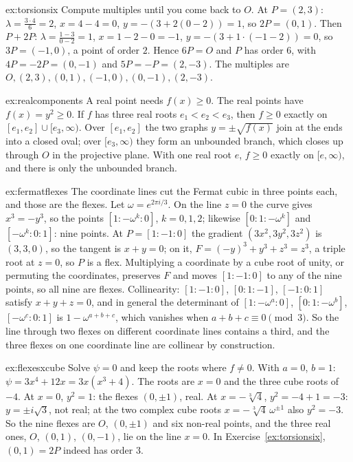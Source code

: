 \begin{solution}{ex:torsionsix}
\idea Compute multiples until you come back to $O$.
\writeup At $P=(2,3)$: $\lambda=\frac{3\cdot4}{6}=2$, $x=4-4=0$, $y=-(3+2(0-2))=1$, so $2P=(0,1)$. Then $P+2P$: $\lambda=\frac{1-3}{0-2}=1$, $x=1-2-0=-1$,
$y=-(3+1\cdot(-1-2))=0$, so $3P=(-1,0)$, a point of order $2$. Hence $6P=O$ and $P$ has order $6$, with $4P=-2P=(0,-1)$ and $5P=-P=(2,-3)$. The multiples are
$O,(2,3),(0,1),(-1,0),(0,-1),(2,-3)$.
\end{solution}

\begin{solution}{ex:realcomponents}
\idea A real point needs $f(x)\ge0$.
\writeup The real points have $f(x)=y^2\ge0$. If $f$ has three real roots $e_1<e_2<e_3$, then $f\ge0$ exactly on $[e_1,e_2]\cup[e_3,\infty)$. Over $[e_1,e_2]$ the
two graphs $y=\pm\sqrt{f(x)}$ join at the ends into a closed oval; over $[e_3,\infty)$ they form an unbounded branch, which closes up through $O$ in the
projective plane. With one real root $e$, $f\ge0$ exactly on $[e,\infty)$, and there is only the unbounded branch.
\end{solution}

\begin{solution}{ex:fermatflexes}
\idea The coordinate lines cut the Fermat cubic in three points each, and those are the flexes.
\writeup Let $\omega=e^{2\pi i/3}$. On the line $z=0$ the curve gives $x^3=-y^3$, so the points $[1:-\omega^k:0]$, $k=0,1,2$; likewise $[0:1:-\omega^k]$ and
$[-\omega^k:0:1]$: nine points. At $P=[1:-1:0]$ the gradient $(3x^2,3y^2,3z^2)$ is $(3,3,0)$, so the tangent is $x+y=0$; on it, $F=(-y)^3+y^3+z^3=z^3$, a triple root
at $z=0$, so $P$ is a flex. Multiplying a coordinate by a cube root of unity, or permuting the coordinates, preserves $F$ and moves $[1:-1:0]$ to any of the nine points, so all nine
are flexes. Collinearity:
$[1:-1:0]$, $[0:1:-1]$, $[-1:0:1]$ satisfy $x+y+z=0$, and in general the determinant of $[1:-\omega^a:0]$, $[0:1:-\omega^b]$, $[-\omega^c:0:1]$ is
$1-\omega^{a+b+c}$, which vanishes when $a+b+c\equiv0\pmod3$. So the line through two flexes on different coordinate lines contains a third, and the three
flexes on one coordinate line are collinear by construction.
\end{solution}

\begin{solution}{ex:flexesxcube}
\idea Solve $\psi=0$ and keep the roots where $f\ne0$.
\writeup With $a=0$, $b=1$: $\psi=3x^4+12x=3x(x^3+4)$. The roots are $x=0$ and the three cube roots of $-4$. At $x=0$, $y^2=1$: the flexes $(0,\pm1)$, real. At
$x=-\sqrt[3]4$, $y^2=-4+1=-3$: $y=\pm i\sqrt3$, not real; at the two complex cube roots $x=-\sqrt[3]4\,\omega^{\pm1}$ also $y^2=-3$. So the nine flexes are $O$, $(0,\pm1)$
and six non-real points, and the three real ones, $O$, $(0,1)$, $(0,-1)$, lie on the line $x=0$. In Exercise~\ref{ex:torsionsix}, $(0,1)=2P$ indeed has order $3$.
\end{solution}


